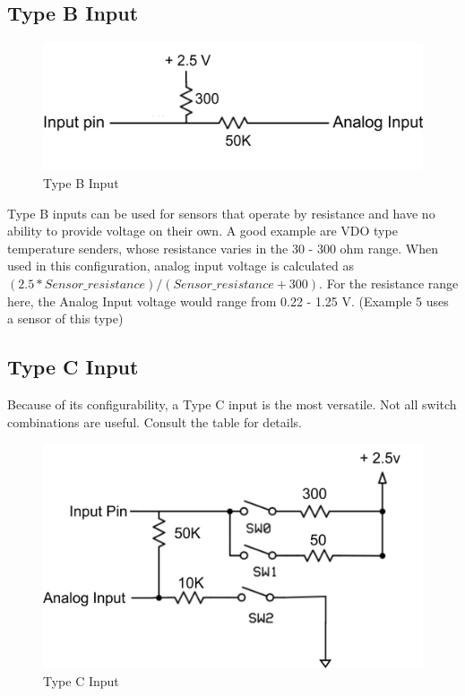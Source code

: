 \documentclass[12pt, letterpaper, twoside, titlepage]{article}
\begin{document}
\subsection{Type B Input}
\begin{figure}[hbt!]
  \includegraphics[scale=0.7]{Type B input.png}
  \centering
  \caption{Type B Input}
  \label{fig:Type B}
\end{figure}

Type B inputs can be used for sensors that operate by resistance and have no ability to provide voltage on their own.  A good example are VDO type temperature senders, whose resistance varies in the 30 - 300 ohm range.  When used in this configuration, analog input voltage is calculated as $ (2.5 * Sensor\_resistance)/(Sensor\_resistance + 300)$.  For the resistance range here, the Analog Input voltage would range from 0.22 - 1.25 V. (Example 5 uses a sensor of this type)

\subsection{Type C Input}
Because of its configurability, a Type C input is the most versatile.  Not all switch combinations are useful.  Consult the table for details. 
\begin{figure}[hbt!]
  \includegraphics[scale=0.7]{Type C input.png}
  \centering
  \caption{Type C Input}
  \label{fig:Type C}
\end{figure}
\end{document}

